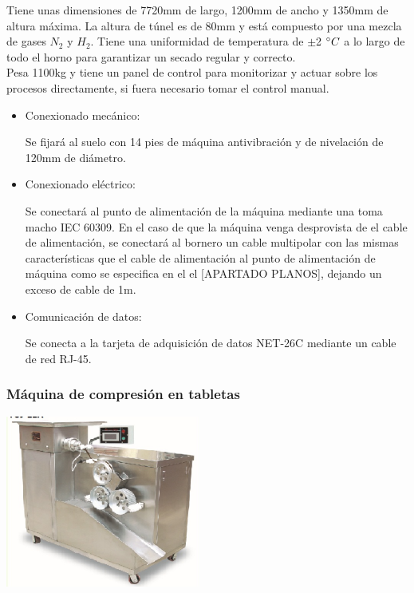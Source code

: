 	Tiene unas dimensiones de 7720mm de largo, 1200mm de ancho y 1350mm de altura máxima. La altura de túnel es de 80mm y está compuesto por una mezcla de gases $N_2$ y $H_2$. Tiene una uniformidad de temperatura de $\pm$2 $\degree C$ a lo largo de todo el horno para garantizar un secado regular y correcto.\\

	Pesa 1100kg y tiene un panel de control para monitorizar y actuar sobre los procesos directamente, si fuera necesario tomar el control manual.

		\begin{itemize}
				\item{Conexionado mecánico:}
				
				Se fijará al suelo con 14 pies de máquina antivibración y de nivelación de 120mm de diámetro.

				\item{Conexionado eléctrico:}

				Se conectará al punto de alimentación de la máquina mediante una  toma macho IEC 60309. En el caso de que la máquina venga desprovista de el cable de alimentación, se conectará al bornero un cable multipolar con las mismas características que el cable de alimentación al punto de alimentación de máquina como se especifica en el el [APARTADO PLANOS], dejando un exceso de cable de 1m. \
				
				\item{Comunicación de datos:}

				Se conecta a la tarjeta de adquisición de datos NET-26C mediante un cable de red RJ-45.
				
		\end{itemize}

	\newpage

	\subsubsection{Máquina de compresión en tabletas}

	\includegraphics[scale=1]{Datasheets/2MaquinaPrensadoFoto.png}\\

